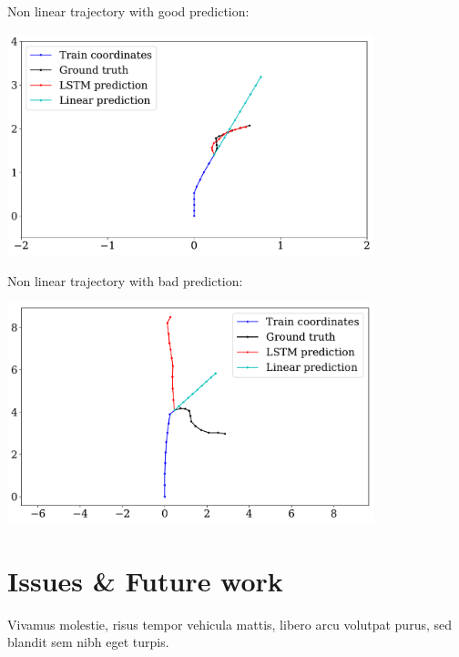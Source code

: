 \documentclass[a0,portrait]{a0poster}
\begin{document}
\begin{multicols}{2}
\begin{minipage}[]{0.5\linewidth}
Non linear trajectory with good prediction:\\
\centerline {\includegraphics[width=0.8\textwidth]{figure/fig_1552}}
\end{minipage}
\hfill
\begin{minipage}[]{0.5\linewidth}
Non linear trajectory with bad prediction:\\
\centerline {\includegraphics[width=0.8\textwidth]{figure/fig_1621}}
\end{minipage}


\section*{Issues \& Future work}

Vivamus molestie, risus tempor vehicula mattis, libero arcu volutpat purus, sed blandit sem nibh eget turpis.


\nocite{*} %


\end{multicols}
\end{document}
